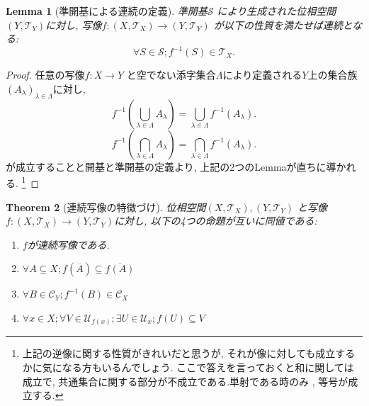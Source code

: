 \documentclass[dvipdfmx]{jbook}
\newcommand{\cl}[1]{\overline{ #1}  }
\newtheorem{theorem}{Theorem}[section]
\newtheorem{lemma}[theorem]{Lemma}
\theoremstyle{remark}
\theoremstyle{plain}
\begin{document}
\begin{lemma}[準開基による連続の定義]
	準開基$\mathcal{S}$ により生成された位相空間$\left( Y, \mathcal{T}_Y \right) $に対し, 写像$f: \left( X , \mathcal{T}_X \right) \to \left( Y, \mathcal{T}_Y \right) $ が以下の性質を満たせば連続となる:
\[
\forall S \in \mathcal{S}; f^{-1}\left( S \right) \in \mathcal{T}_X
.\] 

\end{lemma}

\begin{proof}
	任意の写像$f: X \to Y$ と空でない添字集合$\Lambda$により定義される$Y$上の集合族 $\left( A_{\lambda} \right) _{\lambda \in \Lambda}$に対し,
	\[
	f^{-1}\left( \bigcup_{\lambda \in \Lambda} A_{\lambda}  \right) = \bigcup_{\lambda \in \Lambda} f^{-1}\left( A_\lambda \right) 
	.\] 
	\[
	f^{-1}\left( \bigcap_{\lambda \in \Lambda} A_{\lambda}  \right) = \bigcap_{\lambda \in \Lambda} f^{-1}\left( A_\lambda \right) 
	.\]
	が成立することと開基と準開基の定義より, 上記の2つのLemmaが直ちに導かれる. 
	\footnote{上記の逆像に関する性質がきれいだと思うが, それが像に対しても成立するかに気になる方もいるんでしょう. 
	ここで答えを言っておくと和に関しては成立で, 共通集合に関する部分が{\color{red}不成立}である.単射である時のみ , 等号が成立する.}
\end{proof}

\begin{theorem}[連続写像の特徴づけ]
	位相空間$\left( X,\mathcal{T}_X \right) ,\left( Y,\mathcal{T}_Y \right) $ と写像$f:\left( X,\mathcal{T}_X \right) \to \left( Y,\mathcal{T}_Y \right)$に対し, 以下の4つの命題が互いに同値である:
	\begin{enumerate}
		\item $f$が連続写像である.
		\item  $\forall A \subseteq X ; f\left( \cl{A} \right) \subseteq \cl{f\left( A \right) }$ 
		\item $\forall B \in \mathcal{C}_Y; f^{-1}\left( B \right)  \in \mathcal{C}_X$ 
		\item $\forall x \in X; \forall V \in \mathcal{U}_{f(x)};\exists U \in \mathcal{U}_x; f(U) \subseteq V $
	\end{enumerate}
\end{theorem}
\end{document}
